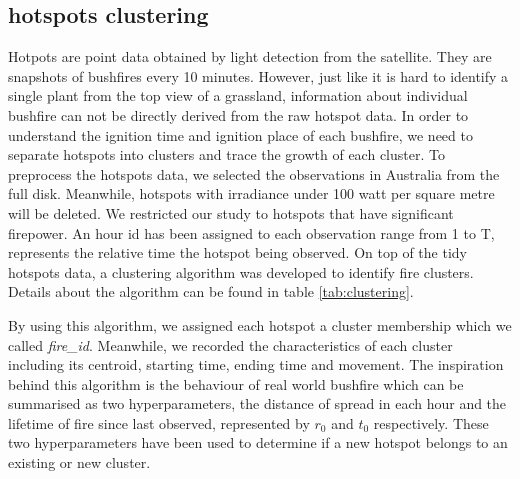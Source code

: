 \documentclass{monashthesis}
\begin{document}
\subsection{hotspots clustering}\label{hotspots-clustering}

Hotpots are point data obtained by light detection from the satellite.
They are snapshots of bushfires every 10 minutes. However, just like it
is hard to identify a single plant from the top view of a grassland,
information about individual bushfire can not be directly derived from
the raw hotspot data. In order to understand the ignition time and
ignition place of each bushfire, we need to separate hotspots into
clusters and trace the growth of each cluster. To preprocess the
hotspots data, we selected the observations in Australia from the full
disk. Meanwhile, hotspots with irradiance under 100 watt per square
metre will be deleted. We restricted our study to hotspots that have
significant firepower. An hour id has been assigned to each observation
range from 1 to T, represents the relative time the hotspot being
observed. On top of the tidy hotspots data, a clustering algorithm was
developed to identify fire clusters. Details about the algorithm can be
found in table \ref{tab:clustering}.

By using this algorithm, we assigned each hotspot a cluster membership
which we called \emph{fire\_id}. Meanwhile, we recorded the
characteristics of each cluster including its centroid, starting time,
ending time and movement. The inspiration behind this algorithm is the
behaviour of real world bushfire which can be summarised as two
hyperparameters, the distance of spread in each hour and the lifetime of
fire since last observed, represented by \(r_0\) and \(t_0\)
respectively. These two hyperparameters have been used to determine if a
new hotspot belongs to an existing or new cluster.

\normalfont
\end{document}
